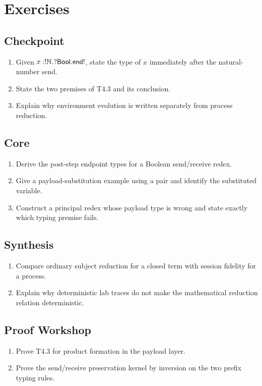 \section{Exercises}
\subsection*{Checkpoint}
\begin{enumerate}[label=\textbf{3.\arabic*},start=1]
\item Given $x:!\mathbb{N}.?\mathsf{Bool}.\mathsf{end!}$, state the type of $x$ immediately after the natural-number send.
\item State the two premises of T4.3 and its conclusion.
\item Explain why environment evolution is written separately from process reduction.
\end{enumerate}
\subsection*{Core}
\begin{enumerate}[label=\textbf{3.\arabic*},start=4]
\item Derive the post-step endpoint types for a Boolean send/receive redex.
\item Give a payload-substitution example using a pair and identify the substituted variable.
\item Construct a principal redex whose payload type is wrong and state exactly which typing premise fails.
\end{enumerate}
\subsection*{Synthesis}
\begin{enumerate}[label=\textbf{3.\arabic*},start=7]
\item Compare ordinary subject reduction for a closed term with session fidelity for a process.
\item Explain why deterministic lab traces do not make the mathematical reduction relation deterministic.
\end{enumerate}
\subsection*{Proof Workshop}
\begin{enumerate}[label=\textbf{3.\arabic*},start=9]
\item Prove T4.3 for product formation in the payload layer.
\item Prove the send/receive preservation kernel by inversion on the two prefix typing rules.
\end{enumerate}
